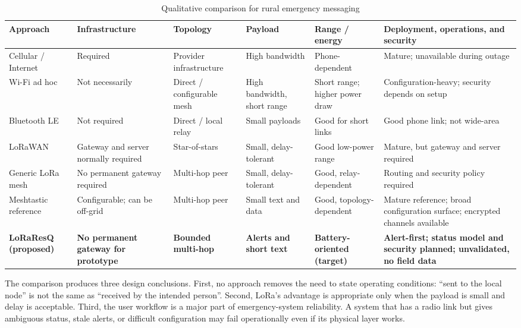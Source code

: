 \documentclass[journal]{IEEEtran}
\begin{document}
\begin{table}[t]
\caption{Qualitative comparison for rural emergency messaging}
\label{tab:comparison}
\centering
\scriptsize
\begin{tabularx}{\textwidth}{@{}>{\raggedright\arraybackslash}X
>{\raggedright\arraybackslash}X
>{\raggedright\arraybackslash}X
>{\raggedright\arraybackslash}X
>{\raggedright\arraybackslash}X
>{\raggedright\arraybackslash}X@{}}
\toprule
\textbf{Approach} & \textbf{Infrastructure} & \textbf{Topology} &
\textbf{Payload} & \textbf{Range / energy} & \textbf{Deployment, operations,
and security} \\
\midrule
Cellular / Internet & Required & Provider infrastructure &
High bandwidth & Phone-dependent & Mature; unavailable during outage \\
Wi-Fi ad hoc & Not necessarily & Direct / configurable mesh &
High bandwidth, short range & Short range; higher power draw & Configuration-heavy; security depends on setup \\
Bluetooth LE & Not required & Direct / local relay &
Small payloads & Good for short links & Good phone link; not wide-area \\
LoRaWAN & Gateway and server normally required & Star-of-stars &
Small, delay-tolerant & Good low-power range & Mature, but gateway and server required \\
Generic LoRa mesh & No permanent gateway required & Multi-hop peer &
Small, delay-tolerant & Good, relay-dependent & Routing and security policy required \\
Meshtastic reference & Configurable; can be off-grid & Multi-hop peer &
Small text and data & Good, topology-dependent & Mature reference; broad configuration surface; encrypted channels available \\
\textbf{LoRaResQ (proposed)} & \textbf{No permanent gateway for prototype} &
\textbf{Bounded multi-hop} & \textbf{Alerts and short text} &
\textbf{Battery-oriented (target)} & \textbf{Alert-first; status model and security planned; unvalidated, no field data} \\
\bottomrule
\end{tabularx}
\end{table}

The comparison produces three design conclusions. First, no approach removes
the need to state operating conditions: ``sent to the local node'' is not the
same as ``received by the intended person''. Second, LoRa's advantage is
appropriate only when the payload is small and delay is acceptable. Third, the
user workflow is a major part of emergency-system reliability. A system that
has a radio link but gives ambiguous status, stale alerts, or difficult
configuration may fail operationally even if its physical layer works.
\end{document}
